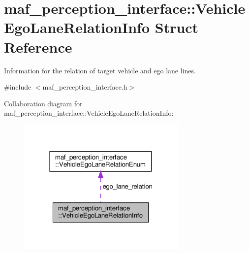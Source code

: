 \hypertarget{structmaf__perception__interface_1_1VehicleEgoLaneRelationInfo}{}\section{maf\+\_\+perception\+\_\+interface\+:\+:Vehicle\+Ego\+Lane\+Relation\+Info Struct Reference}
\label{structmaf__perception__interface_1_1VehicleEgoLaneRelationInfo}


Information for the relation of target vehicle and ego lane lines.  




{\ttfamily \#include $<$maf\+\_\+perception\+\_\+interface.\+h$>$}



Collaboration diagram for maf\+\_\+perception\+\_\+interface\+:\+:Vehicle\+Ego\+Lane\+Relation\+Info\+:\nopagebreak
\begin{figure}[H]
\begin{center}
\leavevmode
\includegraphics[width=237pt]{structmaf__perception__interface_1_1VehicleEgoLaneRelationInfo__coll__graph}
\end{center}
\end{figure}
